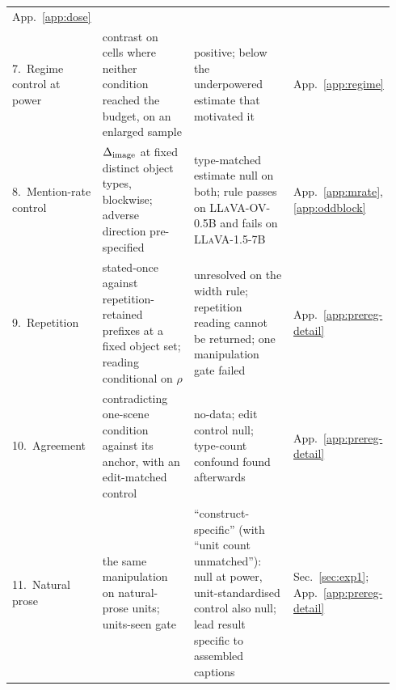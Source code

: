 \begin{table}[htbp]
\begin{center}
\begin{tabular}{@{}p{0.17\linewidth}p{0.305\linewidth}p{0.345\linewidth}p{0.12\linewidth}@{}}
\raggedright App.~\ref{app:dose} \tabularnewline\addlinespace[1pt]
\raggedright 7.\ Regime control at power &
\raggedright contrast on cells where neither condition reached the budget, on an enlarged sample &
\raggedright positive; below the underpowered estimate that motivated it &
\raggedright App.~\ref{app:regime} \tabularnewline\addlinespace[1pt]
\raggedright 8.\ Mention-rate control &
\raggedright $\Delta_{\mathrm{image}}$ at fixed distinct object types, blockwise; adverse direction pre-specified &
\raggedright type-matched estimate null on both; rule passes on \textsc{LLaVA-OV-0.5B} and fails on \textsc{LLaVA-1.5-7B} &
\raggedright App.~\ref{app:mrate}, \ref{app:oddblock} \tabularnewline
\midrule
\raggedright 9.\ Repetition &
\raggedright stated-once against repetition-retained prefixes at a fixed object set; reading conditional on $\rho$ &
\raggedright unresolved on the width rule; repetition reading cannot be returned; one manipulation gate failed &
\raggedright App.~\ref{app:prereg-detail} \tabularnewline\addlinespace[1pt]
\raggedright 10.\ Agreement &
\raggedright contradicting one-scene condition against its anchor, with an edit-matched control &
\raggedright no-data; edit control null; type-count confound found afterwards &
\raggedright App.~\ref{app:prereg-detail} \tabularnewline\addlinespace[1pt]
\raggedright 11.\ Natural prose &
\raggedright the same manipulation on natural-prose units; units-seen gate &
\raggedright ``construct-specific'' (with ``unit count unmatched''): null at power, unit-standardised control also null; lead result specific to assembled captions &
\raggedright Sec.~\ref{sec:exp1}; App.~\ref{app:prereg-detail} \tabularnewline
\bottomrule
\end{tabular}
\end{center}
\end{table}

